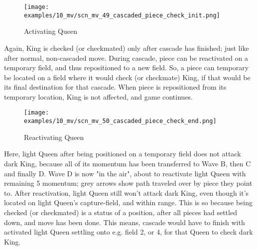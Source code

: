\vspace*{-1.4\baselineskip}
\noindent
\begin{figure}[!h]
\texttt{[image: examples/10\_mv/scn\_mv\_49\_cascaded\_piece\_check\_init.png]}
\caption{Activating Queen}
\label{fig:scn_mv_49_cascaded_piece_check_init}
\end{figure}

Again, King is checked (or checkmated) only after cascade has finished; just like
after normal, non-cascaded move. During cascade, piece can be reactivated on a
temporary field, and thus repositioned to a new field. So, a piece can temporary
be located on a field where it would check (or checkmate) King, if that would be
its final destination for that cascade. When piece is repositioned from its
temporary location, King is not affected, and game continues.

\clearpage %

\vspace*{-2.3\baselineskip}
\noindent
\begin{figure}[!h]
\texttt{[image: examples/10\_mv/scn\_mv\_50\_cascaded\_piece\_check\_end.png]}
\vspace*{-1.3\baselineskip}
\caption{Reactivating Queen}
\label{fig:scn_mv_50_cascaded_piece_check_end}
\end{figure}

\vspace*{-0.3\baselineskip}
Here, light Queen after being positioned on a temporary field does not attack dark
King, because all of its momentum has been transferred to Wave B, then C and finally
D. Wave D is now "in the air", about to reactivate light Queen with remaining 5
momentum; grey arrows show path traveled over by piece they point to. After
reactivation, light Queen still won't attack dark King, even though it's located on
light Queen's capture-field, and within range. This is so because being checked (or
checkmated) is a status of a position, after all pieces had settled down, and move
has been done. This means, cascade would have to finish with activated light Queen
settling onto e.g. field 2, or 4, for that Queen to check dark King.

\clearpage %

